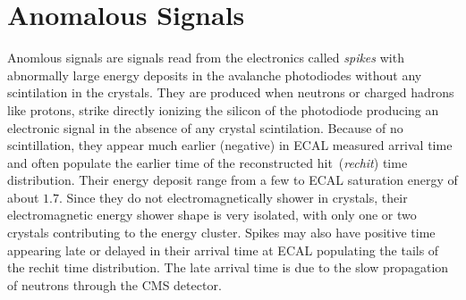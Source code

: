 
\section{Anomalous Signals}
Anomlous signals are signals read from the electronics called \textit{spikes} with abnormally large energy deposits in the avalanche photodiodes without any scintilation in the \pb crystals. They are produced when neutrons or charged hadrons like protons, strike directly ionizing the silicon of the photodiode  producing an electronic signal in the absence of any crystal scintilation.
\newline
Because of no scintillation, they appear much earlier (negative) in ECAL measured arrival time and often populate the earlier time of the reconstructed hit~(\textit{rechit}) time distribution. Their energy deposit range from a few \GeV to ECAL saturation energy of about $1.7$\TeV. Since they do not electromagnetically shower in \pb crystals, their electromagnetic energy shower shape is  very isolated, with only one or two crystals contributing to the energy cluster. Spikes may also have positive time appearing late or delayed in their arrival time at ECAL populating the tails of the rechit time distribution. The late arrival time is due to the slow propagation of neutrons through the CMS detector. 
